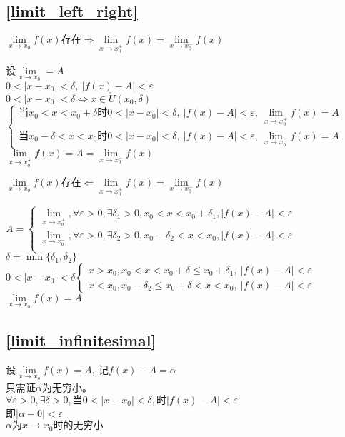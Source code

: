 \subsection{\ref{limit_left_right}}
$\lim\limits_{x\to x_0}f(x)\mbox{存在}\Rightarrow \lim\limits_{x\to x_0^+}f(x)=\lim\limits_{x\to x_0^-}f(x)$
\begin{center}
    设$\lim\limits_{x\to x_0}=A$\\
    $0<\left|x-x_0\right|<\delta,\ \left|f(x)-A\right|<\varepsilon$\\
    $0<\left|x-x_0\right|<\delta\Leftrightarrow x\in \mathring{U}(x_0,\delta)$
    $\begin{cases}
        \mbox{当}x_0<x<x_0+\delta\mbox{时}0<\left|x-x_0\right|<\delta,\ \left|f(x)-A\right|<\varepsilon,\ \lim\limits_{x\to x_0^+}f(x)=A\\
        \mbox{当}x_0-\delta<x<x_0\mbox{时}0<\left|x-x_0\right|<\delta,\ \left|f(x)-A\right|<\varepsilon,\ \lim\limits_{x\to x_0^-}f(x)=A
    \end{cases}$
    $\lim\limits_{x\to x_0^+}f(x)=A =\lim\limits_{x\to x_0^-}f(x)$
\end{center}
$\lim\limits_{x\to x_0}f(x)\mbox{存在}\Leftarrow\lim\limits_{x\to x_0^+}f(x)=\lim\limits_{x\to x_0^-}f(x)$
\begin{center}
    $A=\begin{cases}
    \lim\limits_{x\to x_o^+},\forall\varepsilon>0,\exists\delta_1>0,x_0<x<x_0+\delta_1,\left|f(x)-A\right|<\varepsilon\\
    \lim\limits_{x\to x_o^-},\forall\varepsilon>0,\exists\delta_2>0,x_0-\delta_2<x<x_0,\left|f(x)-A\right|<\varepsilon\\
    \end{cases}$\\
    $\delta = \min\{\delta_1,\delta_2\}$\\
    $0<\left|x-x_0\right|<\delta\begin{cases}
        x>x_0,x_0<x<x_0+\delta\leqslant x_0+\delta_1,\  \left|f(x)-A\right|<\varepsilon\\
        x<x_0,x_0-\delta_2\leqslant x_0+\delta<x<x_0,\ \left|f(x)-A\right|<\varepsilon
    \end{cases}$\\
    $\lim\limits_{x\to x_0}f(x)=A$
\end{center}
\subsection{\ref{limit_infinitesimal}}
设$\lim\limits_{x\to x_o}f(x)=A,\ \mbox{记}f(x)-A=\alpha$\\
只需证$\alpha$为无穷小。\\
$\forall\varepsilon>0,\exists\delta>0,\mbox{当}0<\left|x-x_0\right|<\delta,\mbox{时}\left|f(x)-A\right|<\varepsilon$\\
即$\left|\alpha-0\right|<\varepsilon$\\
$\alpha\mbox{为}x\rightarrow x_0\mbox{时的无穷小}$
